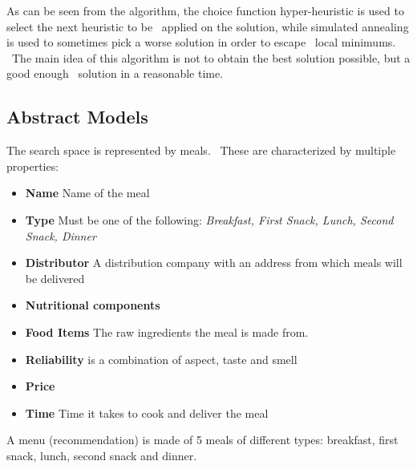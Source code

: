 As can be seen from the algorithm, the choice function hyper-heuristic is used to select the next heuristic to be \
applied on the solution, while simulated annealing is used to sometimes pick a worse solution in order to escape \
local minimums. \
The main idea of this algorithm is not to obtain the best solution possible, but a good enough \
solution in a reasonable time.


\subsection{Abstract Models}
\label{subsec:analysis-models}
The search space is represented by meals. \
These are characterized by multiple properties:
\begin{itemize}
    \item \textbf{Name} Name of the meal
    \item \textbf{Type} Must be one of the following: \textit{Breakfast, First Snack, Lunch, Second Snack, Dinner}
    \item \textbf{Distributor} A distribution company with an address from which meals will be delivered
    \item \textbf{Nutritional components}
    \item \textbf{Food Items} The raw ingredients the meal is made from.
    \item \textbf{Reliability} is a combination of aspect, taste and smell
    \item \textbf{Price}
    \item \textbf{Time} Time it takes to cook and deliver the meal
\end{itemize}
A menu (recommendation) is made of 5 meals of different types: breakfast, first snack, lunch, second snack and dinner.




